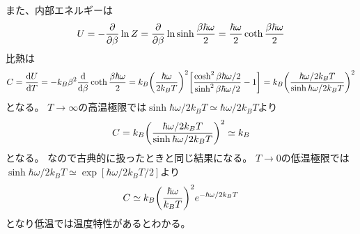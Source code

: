 \documentclass[../../sp_2015.tex]{subfiles}
\begin{document}
また、内部エネルギーは
\begin{equation}\begin{aligned}[b]
    U = -\pdv{\beta}\ln Z
    = \pdv{\beta} \ln\sinh\frac{\beta\hbar\omega}{2}
    =\frac{\hbar\omega}{2}\coth\frac{\beta\hbar\omega}{2}
\end{aligned}\end{equation}
比熱は
\begin{equation}\begin{aligned}[b]
    C = \dv{U}{T}
    = -k_B\beta^2\dv{\beta}\coth\frac{\beta\hbar\omega}{2}
    = k_B\qty(\frac{\hbar\omega}{2k_BT})^2\qty[\frac{\cosh^2\beta\hbar\omega/2}{\sinh^2\beta\hbar\omega/2}-1]
    = k_B \qty(\frac{\hbar\omega/2k_BT}{\sinh\hbar\omega/2k_BT})^2
\end{aligned}\end{equation}
となる。
\(T\to\infty\)の高温極限では\(\sinh\hbar\omega/2k_BT\simeq\hbar\omega/2k_BT\)より
\begin{equation}\begin{aligned}[b]
    C = k_B \qty(\frac{\hbar\omega/2k_BT}{\sinh\hbar\omega/2k_BT})^2\simeq k_B
\end{aligned}\end{equation}
となる。
なので古典的に扱ったときと同じ結果になる。
\(T\to0\)の低温極限では\(\sinh\hbar\omega/2k_BT\simeq \exp[\hbar\omega/2k_BT/2]\)より
\begin{equation}\begin{aligned}[b]
    C \simeq k_B \qty(\frac{\hbar\omega}{k_BT})^2e^{-\hbar\omega/2k_BT}
\end{aligned}\end{equation}
となり低温では温度特性があるとわかる。

\subsection{}
\end{document}
